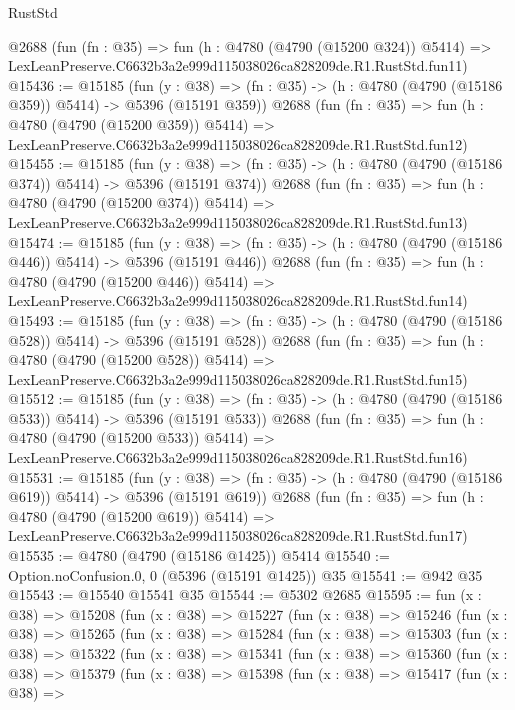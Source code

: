 \begin{lexlean}{RustStd}
\begin{coremodule}
    @2688
    (fun (fn : @35) =>
    fun (h : @4780 (@4790 (@15200 @324)) @5414) =>
    LexLeanPreserve.C6632b3a2e999d115038026ca828209de.R1.RustStd.fun11)
@15436 := @15185
    (fun (y : @38) => (fn : @35) -> (h : @4780 (@4790 (@15186 @359)) @5414) -> @5396 (@15191 @359))
    @2688
    (fun (fn : @35) =>
    fun (h : @4780 (@4790 (@15200 @359)) @5414) =>
    LexLeanPreserve.C6632b3a2e999d115038026ca828209de.R1.RustStd.fun12)
@15455 := @15185
    (fun (y : @38) => (fn : @35) -> (h : @4780 (@4790 (@15186 @374)) @5414) -> @5396 (@15191 @374))
    @2688
    (fun (fn : @35) =>
    fun (h : @4780 (@4790 (@15200 @374)) @5414) =>
    LexLeanPreserve.C6632b3a2e999d115038026ca828209de.R1.RustStd.fun13)
@15474 := @15185
    (fun (y : @38) => (fn : @35) -> (h : @4780 (@4790 (@15186 @446)) @5414) -> @5396 (@15191 @446))
    @2688
    (fun (fn : @35) =>
    fun (h : @4780 (@4790 (@15200 @446)) @5414) =>
    LexLeanPreserve.C6632b3a2e999d115038026ca828209de.R1.RustStd.fun14)
@15493 := @15185
    (fun (y : @38) => (fn : @35) -> (h : @4780 (@4790 (@15186 @528)) @5414) -> @5396 (@15191 @528))
    @2688
    (fun (fn : @35) =>
    fun (h : @4780 (@4790 (@15200 @528)) @5414) =>
    LexLeanPreserve.C6632b3a2e999d115038026ca828209de.R1.RustStd.fun15)
@15512 := @15185
    (fun (y : @38) => (fn : @35) -> (h : @4780 (@4790 (@15186 @533)) @5414) -> @5396 (@15191 @533))
    @2688
    (fun (fn : @35) =>
    fun (h : @4780 (@4790 (@15200 @533)) @5414) =>
    LexLeanPreserve.C6632b3a2e999d115038026ca828209de.R1.RustStd.fun16)
@15531 := @15185
    (fun (y : @38) => (fn : @35) -> (h : @4780 (@4790 (@15186 @619)) @5414) -> @5396 (@15191 @619))
    @2688
    (fun (fn : @35) =>
    fun (h : @4780 (@4790 (@15200 @619)) @5414) =>
    LexLeanPreserve.C6632b3a2e999d115038026ca828209de.R1.RustStd.fun17)
@15535 := @4780 (@4790 (@15186 @1425)) @5414
@15540 := Option.noConfusion.{0, 0} (@5396 (@15191 @1425)) @35
@15541 := @942 @35
@15543 := @15540 @15541 @35
@15544 := @5302 @2685
@15595 := fun (x : @38) =>
  @15208
    (fun (x : @38) =>
    @15227
      (fun (x : @38) =>
      @15246
        (fun (x : @38) =>
        @15265
          (fun (x : @38) =>
          @15284
            (fun (x : @38) =>
            @15303
              (fun (x : @38) =>
              @15322
                (fun (x : @38) =>
                @15341
                  (fun (x : @38) =>
                  @15360
                    (fun (x : @38) =>
                    @15379
                      (fun (x : @38) =>
                      @15398
                        (fun (x : @38) =>
                        @15417
                          (fun (x : @38) =>

\end{coremodule}
\end{lexlean}
